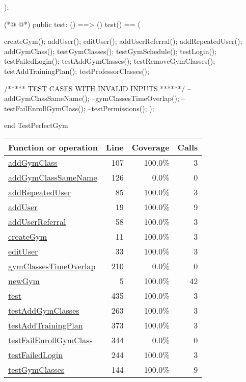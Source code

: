 \begin{vdmpp}[breaklines=true]
 );
  
(*@
\label{test:435}
@*)
 public test: () ==> ()
 test() == (
    
    createGym();
   addUser();
   editUser();
   addUserReferral();
   addRepeatedUser();
   addGymClass();
   testGymClasses();
   testGymSchedule(); 
   testLogin();
   testFailedLogin();
   testAddGymClasses();
   testRemoveGymClasses();
    testAddTrainingPlan();
    testProfessorClasses();
   
   /***** TEST CASES WITH INVALID INPUTS ******/
   --addGymClassSameName();
   --gymClassesTimeOverlap();
   --testFailEnrollGymClass();
   --testPermissions();
 );

 
end TestPerfectGym
\end{vdmpp}
\bigskip
\begin{longtable}{|l|r|r|r|}
\hline
Function or operation & Line & Coverage & Calls \\
\hline
\hline
\hyperref[addGymClass:107]{addGymClass} & 107&100.0\% & 3 \\
\hline
\hyperref[addGymClassSameName:126]{addGymClassSameName} & 126&0.0\% & 0 \\
\hline
\hyperref[addRepeatedUser:85]{addRepeatedUser} & 85&100.0\% & 3 \\
\hline
\hyperref[addUser:19]{addUser} & 19&100.0\% & 9 \\
\hline
\hyperref[addUserReferral:58]{addUserReferral} & 58&100.0\% & 3 \\
\hline
\hyperref[createGym:11]{createGym} & 11&100.0\% & 3 \\
\hline
\hyperref[editUser:33]{editUser} & 33&100.0\% & 3 \\
\hline
\hyperref[gymClassesTimeOverlap:210]{gymClassesTimeOverlap} & 210&0.0\% & 0 \\
\hline
\hyperref[newGym:5]{newGym} & 5&100.0\% & 42 \\
\hline
\hyperref[test:435]{test} & 435&100.0\% & 3 \\
\hline
\hyperref[testAddGymClasses:263]{testAddGymClasses} & 263&100.0\% & 3 \\
\hline
\hyperref[testAddTrainingPlan:373]{testAddTrainingPlan} & 373&100.0\% & 3 \\
\hline
\hyperref[testFailEnrollGymClass:344]{testFailEnrollGymClass} & 344&0.0\% & 0 \\
\hline
\hyperref[testFailedLogin:244]{testFailedLogin} & 244&100.0\% & 3 \\
\hline
\hyperref[testGymClasses:144]{testGymClasses} & 144&100.0\% & 9 \\

\end{longtable}
